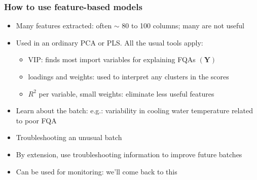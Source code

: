 \begin{frame}\frametitle{How to use feature-based models}

\begin{itemize}
	\item	Many features extracted: often \( \sim \) 80 to 100 columns; many are not useful
	
	\item	Used in an ordinary PCA or PLS.  All the usual tools apply:
	
			\begin{itemize}
				\item	VIP: finds most import variables for explaining FQAs \( (\mathbf{Y}) \)
				
				\item	loadings and weights: used to interpret any clusters in the scores
				
				\item	\( R^2 \) per variable, small weights: eliminate less useful features
			\end{itemize}\pause
	
	\item	Learn about the batch: {\small e.g.: variability in cooling water temperature related to poor FQA}
	
	\item	Troubleshooting an unusual batch 

	\item	By extension, use troubleshooting information to improve future batches \pause
	
	\item	Can be used for monitoring: we'll come back to this
\end{itemize}
\end{frame}

